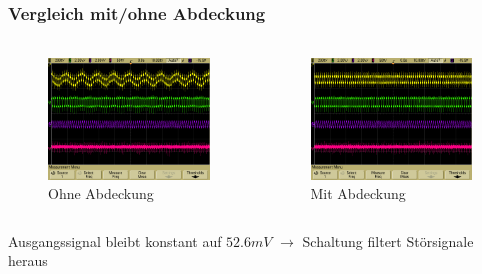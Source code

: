 \begin{frame}
    \frametitle{Vergleich mit/ohne Abdeckung}
    \framesubtitle{}
    \begin{columns}[c]
        \begin{figure}[H]
        \begin{center}
                \includegraphics[scale=0.15]{./img/oszi/scope_23.png}
        \end{center}
        \caption{Ohne Abdeckung}
        \end{figure}
        \begin{figure}[H]
        \begin{center}
                \includegraphics[scale=0.15]{./img/oszi/scope_22.png}
        \end{center}
        \caption{Mit Abdeckung}
        \end{figure}
    \end{columns}
        \begin{block}{}
            Ausgangssignal bleibt konstant auf $52.6mV$ $\rightarrow$ Schaltung
            filtert Störsignale heraus
        \end{block}
\end{frame}
